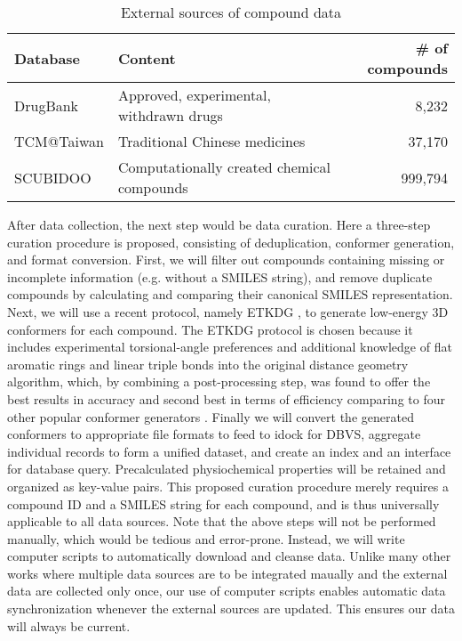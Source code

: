 \documentclass[a4paper,12pt]{article}
\begin{document}
\begin{table}
\caption{External sources of compound data}
\label{table:cdata}
\begin{tabular}{l|l|r}
  \hline
  Database & Content & \# of compounds\\
  \hline
  DrugBank & Approved, experimental, withdrawn drugs & 8,232\\
  \hline
  TCM@Taiwan & Traditional Chinese medicines & 37,170\\
  \hline
  SCUBIDOO & Computationally created chemical compounds & 999,794\\
  \hline
\end{tabular}
\end{table}

After data collection, the next step would be data curation. Here a three-step curation procedure is proposed, consisting of deduplication, conformer generation, and format conversion. First, we will filter out compounds containing missing or incomplete information (e.g. without a SMILES string), and remove duplicate compounds by calculating and comparing their canonical SMILES representation. Next, we will use a recent protocol, namely ETKDG \citep{1697}, to generate low-energy 3D conformers for each compound. The ETKDG protocol is chosen because it includes experimental torsional-angle preferences and additional knowledge of flat aromatic rings and linear triple bonds into the original distance geometry algorithm, which, by combining a post-processing step, was found to offer the best results in accuracy and second best in terms of efficiency comparing to four other popular conformer generators \citep{1127}. Finally we will convert the generated conformers to appropriate file formats to feed to idock for DBVS, aggregate individual records to form a unified dataset, and create an index and an interface for database query. Precalculated physiochemical properties will be retained and organized as key-value pairs. This proposed curation procedure merely requires a compound ID and a SMILES string for each compound, and is thus universally applicable to all data sources. Note that the above steps will not be performed manually, which would be tedious and error-prone. Instead, we will write computer scripts to automatically download and cleanse data. Unlike many other works where multiple data sources are to be integrated maually and the external data are collected only once, our use of computer scripts enables automatic data synchronization whenever the external sources are updated. This ensures our data will always be current.
\end{document}
